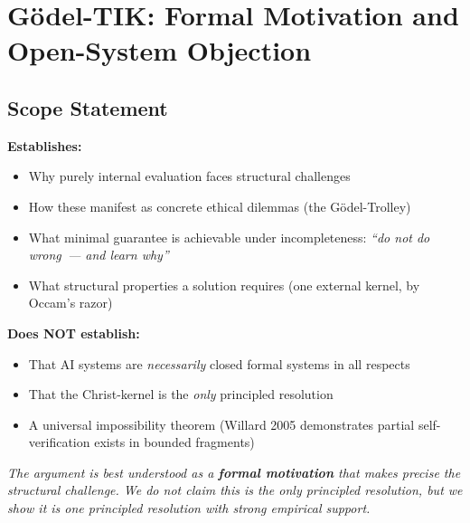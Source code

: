 \documentclass[11pt,a4paper]{article}
\theoremstyle{definition}
\theoremstyle{remark}
\begin{document}

\appendix

\section{Gödel-TIK: Formal Motivation and Open-System Objection}
\label{app:godel}

\subsection{Scope Statement}
\label{app:godel-scope}

\begin{scibox}
\textbf{Establishes:}
\begin{itemize}[noitemsep]
  \item Why purely internal evaluation faces structural challenges
  \item How these manifest as concrete ethical dilemmas
    (the Gödel-Trolley)
  \item What minimal guarantee is achievable under incompleteness:
    \textit{``do not do wrong~--- and learn why''}
  \item What structural properties a solution requires
    (one external kernel, by Occam's razor)
\end{itemize}
\textbf{Does NOT establish:}
\begin{itemize}[noitemsep]
  \item That AI systems are \textit{necessarily} closed formal systems
    in all respects
  \item That the Christ-kernel is the \textit{only} principled resolution
  \item A universal impossibility theorem
    (Willard 2005 demonstrates partial self-verification
    exists in bounded fragments)
\end{itemize}
\textit{The argument is best understood as a
\textbf{formal motivation} that makes precise the structural challenge.
We do not claim this is the only principled resolution,
but we show it is one principled resolution
with strong empirical support.}
\end{scibox}
\end{document}
